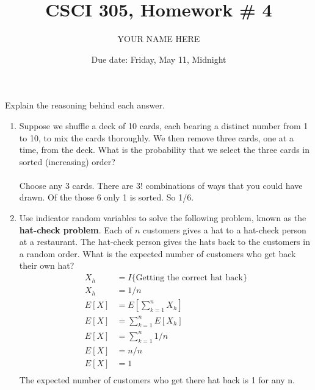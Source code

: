 \documentclass{article}
\title{CSCI 305, Homework \# 4}
\author{YOUR NAME HERE}
\date{Due date:  Friday, May 11, Midnight}
\begin{document}
    
    \maketitle
    
    Explain the reasoning behind each answer.
    
    \begin{enumerate}
    
    \item
      Suppose we shuffle a deck of 10 cards, each bearing a distinct
      number from 1 to 10, to mix the cards thoroughly.  We then remove
      three cards, one at a time, from the deck.  What is the probability
      that we select the three cards in sorted (increasing) order?
      \\
      \\
      Choose any 3 cards. There are 3! combinations of ways that you could have drawn. Of the those 6 only 1 is sorted. So 1/6.
    
    \item
      Use indicator random variables to solve the following problem,
      known as the {\bf hat-check problem}.
      Each of $n$ customers gives a hat to a hat-check person at a
      restaurant.  The hat-check person gives the hats back to the customers
      in a random order.  What is the expected number of customers who get
      back their own hat?
      \\

      \begin{align*}
      X_h &= I\{\mbox{Getting the correct hat back\}}\\
      X_h &= 1/n \\
      E[X] &= E\left[\sum_{k = 1}^n X_h\right] \\
      E[X] &= \sum_{k = 1}^n E[X_h] \\
      E[X] &= \sum_{k = 1}^n 1/n \\
      E[X] &= n/n \\
      E[X] &= 1 \\
      \end{align*}
      The expected number of customers who get there hat back is 1 for any n.      

      
    \end{enumerate}
    
    
\end{document}
